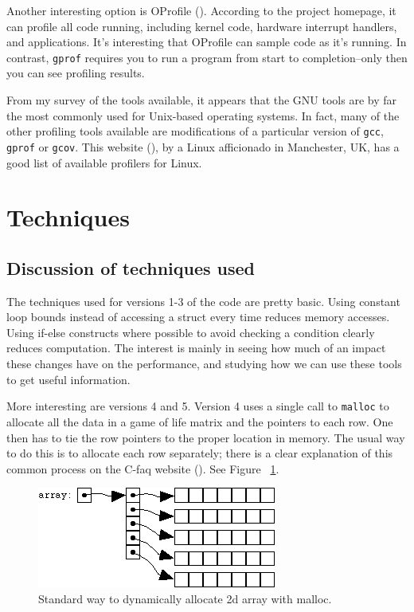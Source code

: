 \documentclass{article}
\begin{document}
Another interesting option is OProfile (\cite{oprofile}). According to the project homepage, it can profile all code running, including kernel code, hardware interrupt handlers, and applications. It's interesting that OProfile can sample code as it's running. In contrast, \verb=gprof= requires you to run a program from start to completion--only then you can see profiling results. 

From my survey of the tools available, it appears that the GNU tools are by far the most commonly used for Unix-based operating systems. In fact, many of the other profiling tools available are modifications of a particular version of \verb=gcc=, \verb=gprof= or \verb=gcov=. This website (\cite{linux_profilers}), by a Linux afficionado in Manchester, UK, has a good list of available profilers for Linux. 

\section{Techniques}
\subsection{Discussion of techniques used}
The techniques used for versions 1-3 of the code are pretty basic. Using constant loop bounds instead of accessing a struct every time reduces memory accesses. Using if-else constructs where possible to avoid checking a condition clearly reduces computation. The interest is mainly in seeing how much of an impact these changes have on the performance, and studying how we can use these tools to get useful information. 
	
More interesting are versions 4 and 5. Version 4 uses a single call to \verb=malloc= to allocate all the data in a game of life matrix and the pointers to each row. One then has to tie the row pointers to the proper location in memory. The usual way to do this is to allocate each row separately; there is a clear explanation of this common process on the C-faq website (\cite{cfaq}). See Figure ~\ref{fig:mallocPic1}. 

\begin{figure}[htp] 
\centering
\includegraphics[scale=0.60]{c-faq-malloc.png}  
\caption{Standard way to dynamically allocate 2d array with malloc.}
\label{fig:mallocPic1}
\end{figure} 
\end{document}
